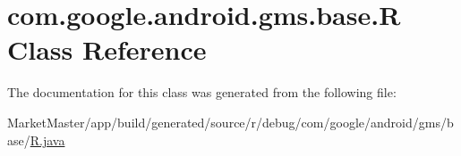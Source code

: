 \hypertarget{classcom_1_1google_1_1android_1_1gms_1_1base_1_1R}{}\section{com.\+google.\+android.\+gms.\+base.\+R Class Reference}
\label{classcom_1_1google_1_1android_1_1gms_1_1base_1_1R}


The documentation for this class was generated from the following file\+:\begin{DoxyCompactItemize}
\item 
Market\+Master/app/build/generated/source/r/debug/com/google/android/gms/base/\mbox{\hyperlink{debug_2com_2google_2android_2gms_2base_2R_8java}{R.\+java}}\end{DoxyCompactItemize}
